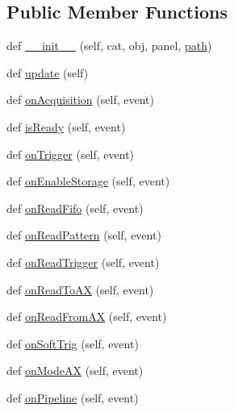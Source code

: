 \subsection*{Public Member Functions}
\begin{DoxyCompactItemize}
\item 
def \hyperlink{classProto40MHz__v1_1_1Proto40MHz__v1_af6ae461ea2c763ce3a87c0752e21b3e4}{\+\_\+\+\_\+init\+\_\+\+\_\+} (self, cat, obj, panel, \hyperlink{classHierarchy_aa7990fa7caf132d83e361ce033c6c65a}{path})
\item 
def \hyperlink{classProto40MHz__v1_1_1Proto40MHz__v1_af042406a0a21ee5721f6513a98d847b0}{update} (self)
\item 
def \hyperlink{classProto40MHz__v1_1_1Proto40MHz__v1_ad89c2823006ad921bcb9f1587797694e}{on\+Acquisition} (self, event)
\item 
def \hyperlink{classProto40MHz__v1_1_1Proto40MHz__v1_a594dddbd5d1eb852aaa71fe9b9a23117}{is\+Ready} (self, event)
\item 
def \hyperlink{classProto40MHz__v1_1_1Proto40MHz__v1_ad3639b823f80b8a837d5c6b0240dfa04}{on\+Trigger} (self, event)
\item 
def \hyperlink{classProto40MHz__v1_1_1Proto40MHz__v1_a504affc7cfd2238410d8856a670415c2}{on\+Enable\+Storage} (self, event)
\item 
def \hyperlink{classProto40MHz__v1_1_1Proto40MHz__v1_af4681815eba15ad08b366382e6724208}{on\+Read\+Fifo} (self, event)
\item 
def \hyperlink{classProto40MHz__v1_1_1Proto40MHz__v1_a26f7a8b8616e631dd9f193a683dce4fe}{on\+Read\+Pattern} (self, event)
\item 
def \hyperlink{classProto40MHz__v1_1_1Proto40MHz__v1_ad09ec450bda96a2afa0416eac0456238}{on\+Read\+Trigger} (self, event)
\item 
def \hyperlink{classProto40MHz__v1_1_1Proto40MHz__v1_ab2d7f48fb96de1a4f7e055d222cd81a7}{on\+Read\+To\+AX} (self, event)
\item 
def \hyperlink{classProto40MHz__v1_1_1Proto40MHz__v1_a7c2739aa6bc9aa2b84e5dd61a75f1a8a}{on\+Read\+From\+AX} (self, event)
\item 
def \hyperlink{classProto40MHz__v1_1_1Proto40MHz__v1_a20a1ff18e3e5385432b6b16aafcf5cb4}{on\+Soft\+Trig} (self, event)
\item 
def \hyperlink{classProto40MHz__v1_1_1Proto40MHz__v1_af871ec7ec3be7b3612c48d26148eaef6}{on\+Mode\+AX} (self, event)
\item 
def \hyperlink{classProto40MHz__v1_1_1Proto40MHz__v1_aa4039f9fab5ec8b17cda49278e146bb8}{on\+Pipeline} (self, event)

\end{DoxyCompactItemize}
